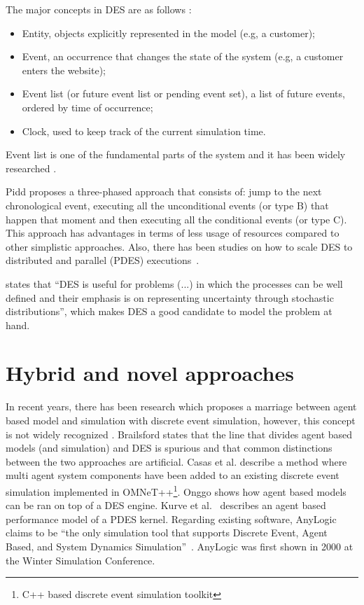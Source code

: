 The major concepts in DES are as follows \cite{Banks2004}:

\begin{itemize}
    \item Entity, objects explicitly represented in the model (e.g, a customer);
    \item Event, an occurrence that changes the state of the system (e.g, a  
    customer enters the website);
    \item Event list (or future event list or pending event set), a list of 
    future events, ordered by time of occurrence;
    \item Clock, used to keep track of the current simulation time.
\end{itemize}

Event list is one of the fundamental parts of the system and it has been widely 
researched \cite{Henriksen1986, Jones1986, Tan2000, Dickman2013}.

Pidd \cite{pidd1998computer} proposes a three-phased approach that consists of: 
jump to the next chronological event, executing all the unconditional events 
(or type B) that happen that moment and then executing all the conditional 
events (or type C). This approach has advantages in terms of less usage of 
resources compared to other simplistic approaches. Also, there has 
been studies on how to scale DES to distributed and parallel (PDES)
executions~\cite{Misra1986, Fujimoto1990}.

\cite{SiebersDES2010} states that ``DES is useful for problems (...) in which 
the processes can be well defined and their emphasis is on representing 
uncertainty through stochastic distributions'', which makes DES a good 
candidate to model the problem at hand.

\section{Hybrid and novel approaches}

In recent years, there has been research which proposes a marriage between 
agent based model and simulation with discrete event simulation, however, this 
concept is not widely recognized \cite{Brailsford2014}. Brailsford states that 
the line that divides agent based models (and simulation) and DES is spurious 
and that common distinctions between the two approaches are artificial. Casas 
et al. \cite{FonsecaiCasas2011} describe a method where multi agent system 
components have been added to an existing discrete event simulation implemented 
in OMNeT++\footnote{C++ based discrete event simulation 
toolkit}\cite{Varga2001}. Onggo \cite{Onggo2007} shows how agent based models 
can be ran on top of a DES engine. Kurve et al.~\cite{Kurve2013} describes an 
agent based performance model of a PDES kernel. Regarding existing software, 
AnyLogic claims to be ``the only simulation tool that supports Discrete Event, 
Agent Based, and System Dynamics Simulation''~\cite{AnyLogic2000}. AnyLogic was 
first shown in 2000 at the Winter Simulation Conference.

